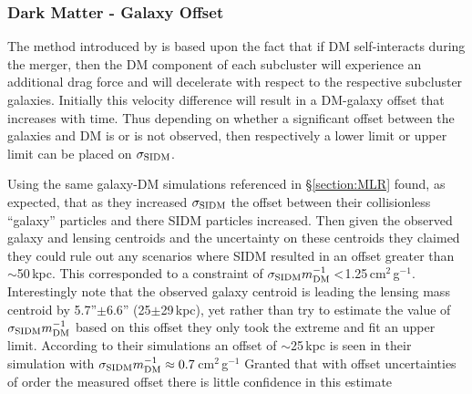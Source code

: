 \subsubsection{Dark Matter - Galaxy Offset}\label{section:DMgalaxyOffsetIntro}

The method introduced by \citet{Randall:2008hs} is based upon the fact that if DM self-interacts during the merger, then the DM component of each subcluster will experience an additional drag force and will decelerate with respect to the respective subcluster galaxies.
Initially this velocity difference will result in a DM-galaxy offset that increases with time.
Thus depending on whether a significant offset between the galaxies and DM is or is not observed, then respectively a lower limit or upper limit can be placed on $\sigma_{\rm SIDM}$.

Using the same galaxy-DM simulations referenced in \S\ref{section:MLR} \citet{Randall:2008hs} found, as expected, that as they increased $\sigma_{\rm SIDM}$ the offset between their collisionless ``galaxy'' particles and there SIDM particles increased.
Then given the observed galaxy and lensing centroids and the uncertainty on these centroids they claimed they could rule out any scenarios where SIDM resulted in an offset greater than $\sim$50\,kpc.
This corresponded to a constraint of $\sigma_{\rm SIDM}m^{-1}_{\rm DM} <$1.25\,cm$^2$\,g$^{-1}$.
Interestingly \citet{Randall:2008hs} note that the observed galaxy centroid is leading the lensing mass centroid by 5.7''$\pm$6.6'' (25$\pm$29\,kpc), yet rather than try to estimate the value of $\sigma_{\rm SIDM}m^{-1}_{\rm DM}$ based on this offset they only took the extreme and fit an upper limit.
According to their simulations an offset of $\sim$25\,kpc is seen in their simulation with $\sigma_{\rm SIDM}m^{-1}_{\rm DM}\approx0.7$\,cm$^2$\,g$^{-1}$
Granted that with offset uncertainties of order the measured offset there is little confidence in this estimate 

